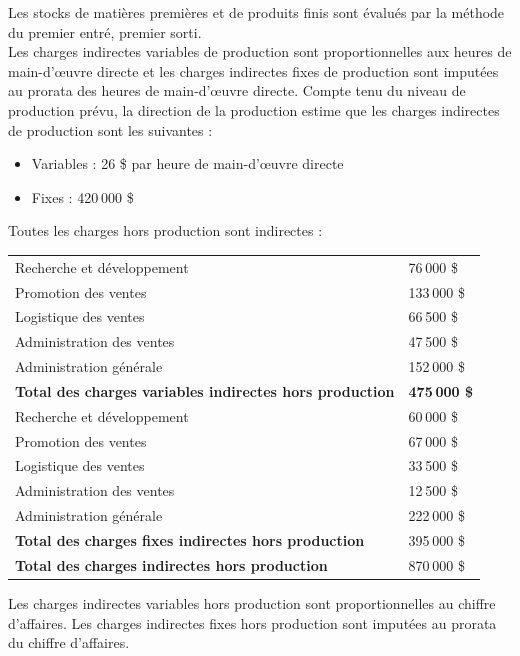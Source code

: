 \documentclass{tufte-handout}
\begin{document}
\begin{enumerate}
Les stocks de matières premières et de produits finis sont évalués par la méthode du premier entré, premier sorti.\\

Les charges indirectes variables de production sont proportionnelles aux heures de main-d’œuvre directe et les charges indirectes fixes de production sont imputées au prorata des heures de main-d’œuvre directe. Compte tenu du niveau de production prévu, la direction de la production estime que les charges indirectes de production sont les suivantes :\\
\begin{itemize}
\item Variables : 26 \$ par heure de main-d’œuvre directe\\
\item Fixes : 420 000 \$\\
\end{itemize}

Toutes les charges hors production sont indirectes :\\
\begin{center}
\begin{tabular}{ll}
Recherche et développement & 76 000 \$\\
Promotion des ventes & 133 000 \$\\
Logistique des ventes & 66 500 \$\\
Administration des ventes & 47 500 \$\\
Administration générale & 152 000 \$\\
\textbf{Total des charges variables indirectes hors production} & \textbf{475 000 \$}\\
Recherche et développement & 60 000 \$\\
Promotion des ventes & 67 000 \$\\
Logistique des ventes & 33 500 \$\\
Administration des ventes & 12 500 \$\\
Administration générale & 222 000 \$\\
\textbf{Total des charges fixes indirectes hors production} & 395 000 \$\\
\textbf{Total des charges indirectes hors production} & 870 000 \$\\
\end{tabular}
\end{center}
Les charges indirectes variables hors production sont proportionnelles au chiffre d’affaires. Les charges indirectes fixes hors production sont imputées au prorata du chiffre d’affaires.\\


\end{enumerate}
\end{document}
